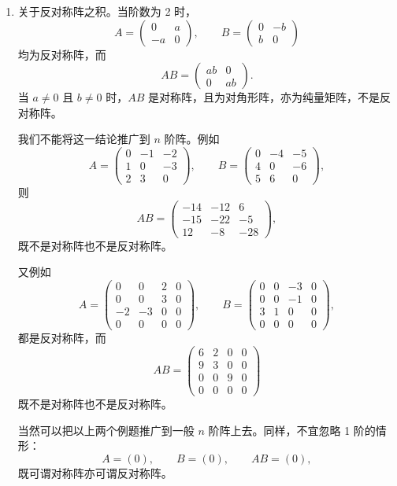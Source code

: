 \begin{enumerate}
\item 关于反对称阵之积。当阶数为 2 时，
\[
 A=\begin{pmatrix}0&a\\-a&0\end{pmatrix},\qquad
 B=\begin{pmatrix}0&-b\\b&0\end{pmatrix}
\]
均为反对称阵，而
\[
 AB=\begin{pmatrix}ab&0\\0&ab\end{pmatrix}.
\]
当 $a\ne0$ 且 $b\ne0$ 时，$AB$ 是对称阵，且为对角形阵，亦为纯量矩阵，不是反对称阵。

我们不能将这一结论推广到 $n$ 阶阵。例如
\[
 A=\begin{pmatrix}
 0&-1&-2\\1&0&-3\\2&3&0
 \end{pmatrix},\qquad
 B=\begin{pmatrix}
 0&-4&-5\\4&0&-6\\5&6&0
 \end{pmatrix},
\]
则
\[
 AB=\begin{pmatrix}
 -14&-12&6\\
 -15&-22&-5\\
 12&-8&-28
 \end{pmatrix},
\]
既不是对称阵也不是反对称阵。

又例如
\[
 A=\begin{pmatrix}
 0&0&2&0\\
 0&0&3&0\\
 -2&-3&0&0\\
 0&0&0&0
 \end{pmatrix},\qquad
 B=\begin{pmatrix}
 0&0&-3&0\\
 0&0&-1&0\\
 3&1&0&0\\
 0&0&0&0
 \end{pmatrix},
\]
都是反对称阵，而
\[
 AB=\begin{pmatrix}
 6&2&0&0\\
 9&3&0&0\\
 0&0&9&0\\
 0&0&0&0
 \end{pmatrix}
\]
既不是对称阵也不是反对称阵。

当然可以把以上两个例题推广到一般 $n$ 阶阵上去。同样，不宜忽略 1 阶的情形：
\[
 A=(0),\qquad B=(0),\qquad AB=(0),
\]
既可谓对称阵亦可谓反对称阵。


\end{enumerate}
